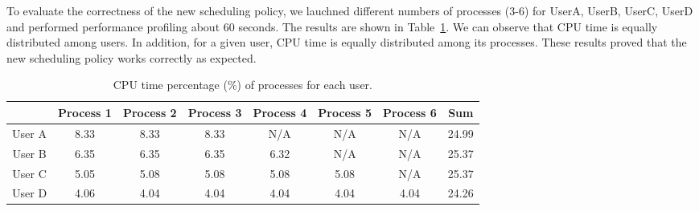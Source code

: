 \documentclass[11pt]{article}
\begin{document}
To evaluate the correctness of the new scheduling policy, we lauchned different numbers of processes (3-6) for UserA, UserB, UserC, UserD and performed performance profiling about 60 seconds. The results are shown in Table~\ref{tab:result}. We can observe that CPU time is equally distributed among users. In addition, for a given user, CPU time is equally distributed among its processes. These results proved that the new scheduling policy works correctly as expected. 

\begin{table}[htbp]
\centering
\begin{tabular}{ |c|c|c|c|c|c|c|c| }
\hline
& Process 1 & Process 2 & Process 3 & Process 4 & Process 5 & Process 6 & Sum \\ \hline
User A & 8.33 & 8.33 & 8.33 & N/A & N/A & N/A & 24.99 \\ \hline
User B & 6.35 & 6.35 & 6.35 & 6.32 & N/A & N/A & 25.37 \\ \hline
User C & 5.05 & 5.08 & 5.08 & 5.08 & 5.08 & N/A & 25.37 \\ \hline
User D & 4.06 & 4.04 & 4.04 & 4.04 & 4.04 & 4.04 & 24.26 \\ \hline
\end{tabular}
\caption{CPU time percentage (\%) of processes for each user.}
\vspace{-.15in}
\label{tab:result}
\end{table}

%

\end{document}
